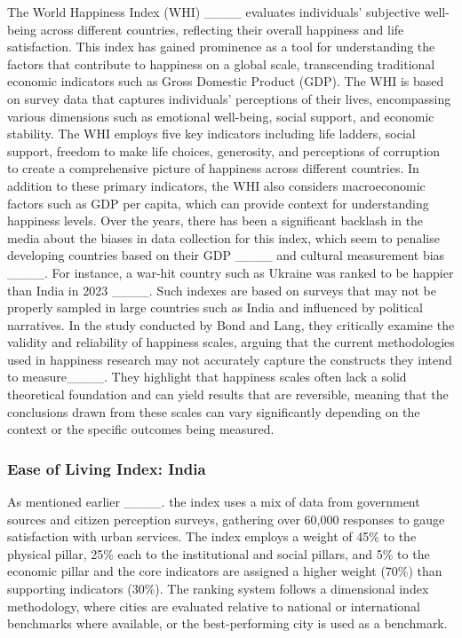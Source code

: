 The World Happiness Index (WHI) ____ evaluates individuals' subjective well-being across different countries, reflecting their overall happiness and life satisfaction. This index has gained prominence as a tool for understanding the factors that contribute to happiness on a global scale, transcending traditional economic indicators such as Gross Domestic Product (GDP). The WHI is based on survey data that captures individuals' perceptions of their lives, encompassing various dimensions such as emotional well-being, social support, and economic stability. The WHI employs five key indicators including life ladders, social support, freedom to make life choices, generosity, and perceptions of corruption to create a comprehensive picture of happiness across different countries.  
In addition to these primary indicators, the WHI also considers macroeconomic factors such as GDP per capita, which can provide context for understanding happiness levels. Over the years, there has been a significant backlash in the media about the biases in data collection for this index, which seem to penalise developing countries based on their GDP ____ and cultural measurement bias ____. For instance, a war-hit country such as Ukraine was ranked to be happier than India in 2023 ____. Such indexes are based on surveys that may not be properly sampled in large countries such as India and influenced by political narratives. In the study conducted by Bond and Lang, they critically examine the validity and reliability of happiness scales, arguing that the current methodologies used in happiness research may not accurately capture the constructs they intend to measure____. They highlight that happiness scales often lack a solid theoretical foundation and can yield results that are reversible, meaning that the conclusions drawn from these scales can vary significantly depending on the context or the specific outcomes being measured.

\subsubsection{Ease of Living Index: India}


As mentioned earlier ____. the index uses a mix of data from government sources and citizen perception surveys, gathering over 60,000 responses to gauge satisfaction with urban services. The index employs a weight of 45\% to the physical pillar, 25\% each to the institutional and social pillars, and 5\% to the economic pillar and the core indicators are assigned a higher weight (70\%) than supporting indicators (30\%). The ranking system follows a dimensional index methodology, where cities are evaluated relative to national or international benchmarks where available, or the best-performing city is used as a benchmark.

